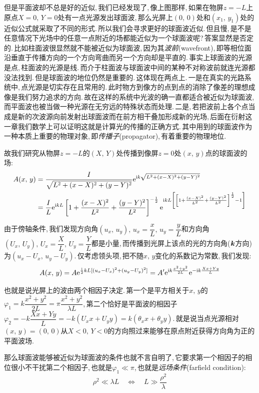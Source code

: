 但是平面波却不总是好的近似,\,我们已经发现了,\,像上图那样,\,如果在物屏$z=-L$上原点$X=0,\,Y=0$处有一点光源发出球面波,\,那么光屏上$(0,\,0)$处和$(x_1,\,y_1)$处的近似公式就采取了不同的形式.\,所以我们会寻求更好的球面波近似.\,但且慢,\,是不是任意情况下光场中的任意一点附近的场都能近似为一个球面波呢?\,答案显然是否定的.\,比如柱面波很显然就不能被近似为球面波,\,因为其\emph{波前}(wavefront),\,即等相位面沿垂直于传播方向的一个方向弯曲而另一个方向却是平直的.\,事实上球面波的光源是点,\,柱面波的光源是线.\,而介于柱面波与球面波中间的某种不对称波前就连光源都没法找到.\,但是球面波的地位仍然是重要的.\,这体现在两点上.\,一是在真实的光路系统中,\,点光源是切实存在且常用的.\,此时物方到像方的点到点的消除了像差的理想成像是我们努力追求的方向.\,故在这样的系统中光波的确一直都适合被近似为球面波,\,而平面波也被当做一种光源在无穷远的特殊状态而处理.\,二是,\,若把波前上各个点当成是新的次波源向前发射出球面波而在前方相干叠加形成新的光场,\,后面在衍射这一章我们数学上可以证明这就是计算光的传播的正确方式.\,其中用到的球面波作为一种本质上重要的物理对象,\,即\emph{传播子}(propagator),\,有着重要的物理地位.

故我们研究从物屏$z=-L$的$(X,\,Y)$处传播到像屏$z=0$处$(x,\,y)$点的球面波的场:
\begin{align*}
A(x,\,y)	&=\frac{I}{\sqrt{L^2+(x-X)^2+(y-Y)^2}}{\rm e}^{{\rm i} k\sqrt{L^2+(x-X)^2+(y-Y)^2}}\\
			&=\frac{I}{L}{\rm e}^{{\rm i} kL}\left[1+\frac{(x-X)^2}{L^2}+\frac{(y-Y)^2}{L^2}\right]^{-\frac{1}{2}}{\rm e}^{{\rm i} kL\left[\left[1+\frac{(x-X)^2}{L^2}+\frac{(y-Y)^2}{L^2}\right]^{\frac{1}{2}}-1\right]}
\end{align*}

由于傍轴条件,\,我们发现方向角$(u_x,\,u_y),\,u_x=\dfrac{x}{L},\,u_y=\dfrac{y}{L}$和方向角$(U_x,\,U_y),\,U_x=\dfrac{X}{L},\,U_y=\dfrac{Y}{L}$都是小量,\,而传播到光屏上该点的光的方向角($\boldsymbol{k}$方向)为$(u_x-U_x,\,u_y-U_y)$.\,仅考虑领头项,\,把不随$x,\,y$变化的系数记为常数,\,我们发现:
\[A(x,\,y)=A{\rm e}^{\frac{{\rm i}}{2}kL[(u_x-U_x)^2+(u_y-U_y)^2]}=A'{\rm e}^{{\rm i} k\frac{x^2+y^2}{2L}}{\rm e}^{-{\rm i} k\frac{Xx+Yy}{L}}\]

也就是说光屏上的波由两个相因子决定.\,第一个是平方相关于$x,\,y$的$\varphi_1=k\dfrac{x^2+y^2}{2L}=\pi \dfrac{x^2+y^2}{\lambda L}$,\,第二个恰好是平面波的相因子$\varphi_2=-k\dfrac{Xx+Yy}{L}=-k(U_x x+U_y y)=k(\theta_x x+\theta_y y)$.\,就是说当点光源相对$(x,\,y)=(0,\,0)$从$X<0,\,Y<0$的方向照过来能够在原点附近获得方向角为正的平面波场.

那么球面波能够被近似为球面波的条件也就不言自明了,\,它要求第一个相因子的相位很小不干扰第二个相因子,\,也就是$\varphi_1\ll \pi$,\,也就是\emph{远场条件}(farfield condition):
\[\rho^2\ll \lambda L\quad \Leftrightarrow \quad L\gg \frac{\rho^2}{\lambda}\]


